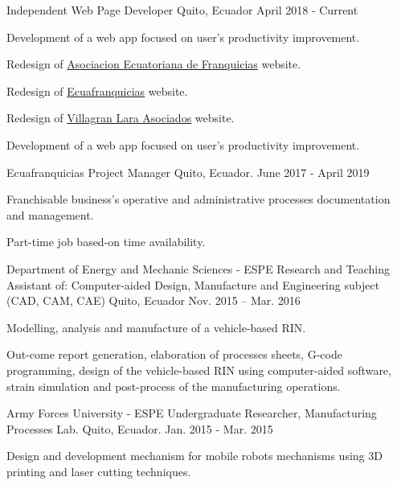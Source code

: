 
\begin{cventries}

  \cventry
    {Independent}
    {Web Page Developer}
    {Quito, Ecuador}
    {April 2018 - Current}
    {
      \begin{cvitems}
        \item {Development of a web app focused on user's productivity improvement.}
        \item {Redesign of \href{https://aefran.org}{Asociacion Ecuatoriana de Franquicias} website.}
        \item {Redesign of \href{http://www.ecuafranquicias.com}{Ecuafranquicias} website.}
        \item {Redesign of \href{http://www.villagranlara.com}{Villagran Lara Asociados} website.}
        \item {Development of a web app focused on user's productivity improvement.}                            
      \end{cvitems} 
    }
    
   \cventry
    {Ecuafranquicias}
    {Project Manager}
    {Quito, Ecuador.}
    {June 2017 - April 2019}
    {
      \begin{cvitems}
        \item {Franchisable business's operative and administrative processes documentation and management.}
        \item {Part-time job based-on time availability.}
      \end{cvitems}
    }

  \cventry
    {Department of Energy and Mechanic Sciences - ESPE}
    {Research and Teaching Assistant of: Computer-aided Design, Manufacture and Engineering subject (CAD, CAM, CAE)	}
    {Quito, Ecuador}
    {Nov. 2015 – Mar. 2016}
    {
      \begin{cvitems}
        \item {Modelling, analysis and manufacture of a vehicle-based RIN. }
        \item {Out-come report generation, elaboration of processes sheets, G-code programming, design of the vehicle-based RIN using computer-aided software, strain simulation and post-process of the manufacturing operations.}
      \end{cvitems}
    }
  
  \cventry
    {Army Forces University - ESPE}
    {Undergraduate Researcher, Manufacturing Processes Lab.}
    {Quito, Ecuador.}
    {Jan. 2015 - Mar. 2015}
    {
      \begin{cvitems}
        \item {Design and development mechanism for mobile robots mechanisms using 3D printing and laser cutting techniques.}
      \end{cvitems}
    }
        
\end{cventries}
